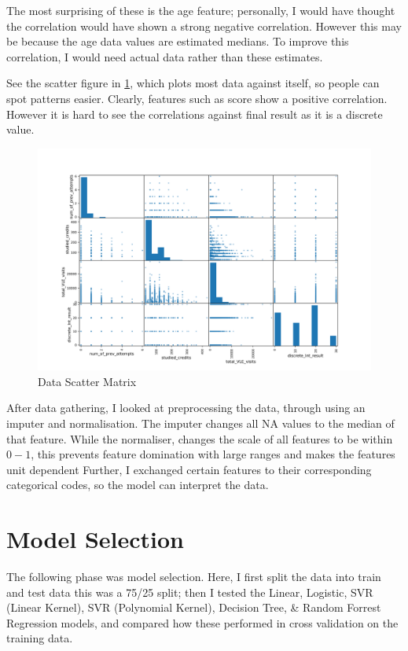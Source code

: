 \documentclass[11pt, a4paper, twocolumn]{article}
\begin{document}
The most surprising of these is the age feature; personally, I would have thought the correlation would have shown a strong negative correlation.
However this may be because the age data values are estimated medians. To improve this correlation, I would need actual data rather than these estimates. 

See the scatter figure in \ref{fig:scatterMatrix}, which plots most data against itself, so people can spot patterns easier. Clearly, features such as score show a positive correlation.
However it is hard to see the correlations against final result as it is a discrete value.

\begin{figure}[]
	\includegraphics[width=2\linewidth]{Correlation} 
	\caption{Data Scatter Matrix}
	\label{fig:scatterMatrix}
\end{figure}


After data gathering, I looked at preprocessing the data, through using an imputer and normalisation. The imputer changes all NA values to the median of that feature. 
While the normaliser, changes the scale of all features to be within $0-1$, this prevents feature domination with large ranges and makes the features unit dependent
Further, I exchanged certain features to their corresponding categorical codes, so the model can interpret the data.\vfill
\vspace*{13cm} \section{Model Selection}

The following phase was model selection. Here, I first split the data into train and test data this was a 75/25 split; then I tested the Linear, Logistic, SVR (Linear Kernel), SVR (Polynomial Kernel), Decision Tree, \& Random Forrest Regression models, and compared how these performed in cross validation on the training data.
\end{document}
